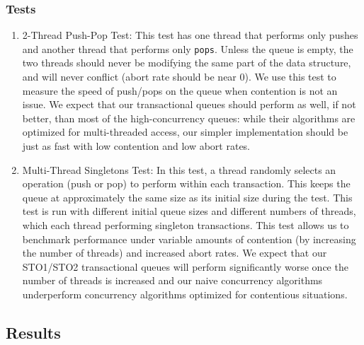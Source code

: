 \subsubsection{Tests}
\begin{enumerate}
\item 2-Thread Push-Pop Test: This test has one thread that performs only pushes and another thread that performs only \texttt{pops}. Unless the queue is empty, the two threads should never be modifying the same part of the data structure, and will never conflict (abort rate should be near 0). We use this test to measure the speed of push/pops on the queue when contention is not an issue. We expect that our transactional queues should perform as well, if not better, than most of the high-concurrency queues: while their algorithms are optimized for multi-threaded access, our simpler implementation should be just as fast with low contention and low abort rates.

\item Multi-Thread Singletons Test: 
    In this test, a thread randomly selects an operation (push or pop) to perform within each transaction. This keeps the queue at approximately the same size as its initial size during the test. This test is run with different initial queue sizes and different numbers of threads, which each thread performing singleton transactions. This test allows us to benchmark performance under variable amounts of contention (by increasing the number of threads) and increased abort rates. We expect that our STO1/STO2 transactional queues will perform significantly worse once the number of threads is increased and our naive concurrency algorithms underperform concurrency algorithms optimized for contentious situations.
    
    
\end{enumerate}

\subsection{Results}

